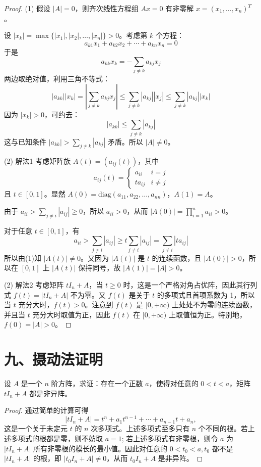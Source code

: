 \documentclass[lang=cn,12pt]{elegantbook}
\begin{document}
\begin{proof}
(1) 假设 $|A| = 0$，则齐次线性方程组 $Ax = 0$ 有非零解 $x = (x_1, \ldots, x_n)^T$。

设 $|x_k| = \max\{|x_1|, |x_2|, \ldots, |x_n|\} > 0$。考虑第 $k$ 个方程：
\[
a_{k1}x_1 + a_{k2}x_2 + \cdots + a_{kn}x_n = 0
\]
于是
\[
a_{kk}x_k = -\sum_{j\neq k} a_{kj}x_j
\]
两边取绝对值，利用三角不等式：
\[
|a_{kk}| |x_k| = \left|\sum_{j\neq k} a_{kj}x_j\right| \leq \sum_{j\neq k} |a_{kj}| |x_j| \leq \sum_{j\neq k} |a_{kj}| |x_k|
\]
因为 $|x_k| > 0$，可约去：
\[
|a_{kk}| \leq \sum_{j\neq k} |a_{kj}|
\]
这与已知条件 $|a_{kk}| > \sum_{j\neq k} |a_{kj}|$ 矛盾。所以 $|A| \neq 0$。

(2) 解法1 考虑矩阵族 $A(t) = (a_{ij}(t))$，其中
\[
a_{ij}(t) = 
\begin{cases}
a_{ii} & i = j \\
t a_{ij} & i \neq j
\end{cases}
\]
且 $t \in [0,1]$。显然 $A(0) = \text{diag}(a_{11}, a_{22}, \ldots, a_{nn})$，$A(1) = A$。

由于 $a_{ii} > \sum_{j\neq i} |a_{ij}| \geq 0$，所以 $a_{ii} > 0$，从而 $|A(0)| = \prod_{i=1}^n a_{ii} > 0$。

对于任意 $t \in [0,1]$，有
\[
a_{ii} > \sum_{j\neq i} |a_{ij}| \geq t \sum_{j\neq i} |a_{ij}| = \sum_{j\neq i} |t a_{ij}|
\]
所以由(1)知 $|A(t)| \neq 0$。又因为 $|A(t)|$ 是 $t$ 的连续函数，且 $|A(0)| > 0$，所以在 $[0,1]$ 上 $|A(t)|$ 保持同号，故 $|A(1)| = |A| > 0$。

(2) 解法2 
    考虑矩阵 \( tI_n + A \)，当 \( t \geq 0 \) 时，这是一个严格对角占优阵，因此其行列式 \( f(t) = |tI_n + A| \) 不为零。又 \( f(t) \) 是关于 \( t \) 的多项式且首项系数为 1，所以当 \( t \) 充分大时，\( f(t) > 0 \)。注意到 \( f(t) \) 是 \([0,+\infty)\) 上处处不为零的连续函数，并且当 \( t \) 充分大时取值为正，因此 \( f(t) \) 在 \([0,+\infty)\) 上取值恒为正。特别地，\( f(0) = |A| > 0 \)。
\end{proof}


\section*{九、摄动法证明}

\begin{example}
    设 \( A \) 是一个 \( n \) 阶方阵，求证：存在一个正数 \( a \)，使得对任意的 \( 0 < t < a \)，矩阵 \( tI_n + A \) 都是非异阵。
    \end{example}
    
    \begin{proof}
    通过简单的计算可得
    \[|tI_n + A| = t^n + a_1 t^{n-1} + \cdots + a_{n-1} t + a_n,\]
    这是一个关于未定元 \( t \) 的 \( n \) 次多项式。上述多项式至多只有 \( n \) 个不同的根。若上述多项式的根都是零，则不妨取 \( a = 1 \); 若上述多项式有非零根，则令 \( a \) 为 \( |tI_n + A| \) 所有非零根的模长的最小值。因此对任意的 \( 0 < t_0 < a, t_0 \) 都不是 \( |tI_n + A| \) 的根，即 \( |t_0 I_n + A| \neq 0 \)，从而 \( t_0 I_n + A \) 是非异阵。
\end{proof}
\end{document}

